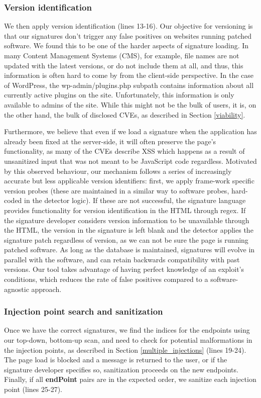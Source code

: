 \subsubsection{Version identification} \label{versioning}
We then apply version identification (lines 13-16). Our objective for versioning is that our signatures don't trigger any false positives on websites running patched software. We found this to be one of the harder aspects of signature loading. In many Content Management Systems (CMS), for example, file names are not updated with the latest versions, or do not include them at all, and thus, this information is often hard to come by from the client-side perspective. In the case of WordPress, the wp-admin/plugins.php subpath contains information about all currently active plugins on the site. Unfortunately, this information is only available to admins of the site. While this might not be the bulk of users, it is, on the other hand, the bulk of disclosed CVEs, as described in Section \ref{viability}.


Furthermore, we believe that even if we load a signature when the application has already been fixed at the server-side, it will often preserve the page's functionality, as many of the CVEs describe XSS which happens as a result of unsanitized input that was not meant to be JavaScript code regardless. Motivated by this observed behaviour, our mechanism follows a series of increasingly accurate but less applicable version identifiers: first, we apply frame-work specific version probes (these are maintained in a similar way to software probes, hard-coded in the detector logic). If these are not successful, the signature language provides functionality for version identification in the HTML through regex. If the signature developer considers version information to be unavailable through the HTML, the version in the signature is left blank and the detector applies the signature patch regardless of version, as we can not be sure the page is running patched software. As long as the database is maintained, signatures will evolve in parallel with the software, and can retain backwards compatibility with past versions. Our tool takes advantage of having perfect knowledge of an exploit's conditions, which reduces the rate of false positives compared to a software-agnostic approach.

 
\subsubsection{Injection point search and sanitization} \label{search_and_sanitization}
Once we have the correct signatures, we find the indices for the endpoints using our top-down, bottom-up scan, and need to check for potential malformations in the injection points, as described in Section \ref{multiple_injections} (lines 19-24). The page load is blocked and a message is returned to the user, or if the signature developer specifies so, sanitization proceeds on the new endpoints. Finally, if all \textbf{endPoint} pairs are in the expected order, we sanitize each injection point (lines 25-27).

